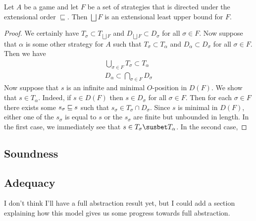 \documentclass{article}
\newcommand{\exle}{\sqsubseteq}
\newcommand{\exlub}{\bigsqcup}
\begin{document}
\begin{proposition}
  Let $A$ be a game and let $F$ be a set of strategies that is directed under the extensional order $\exle$.  Then $\exlub F$ is an extensional least upper bound for $F$.
  \begin{proof}
    We certainly have $T_\sigma\subset T_{\exlub F}$ and $D_{\exlub F}\subset D_\sigma$ for all $\sigma\in F$.  Now suppose that $\alpha$ is some other strategy for $A$ such that $T_\sigma\subset T_\alpha$ and $D_\alpha\subset D_\sigma$ for all $\sigma\in F$.  Then we have
    \begin{gather*}
      \bigcup_{\sigma\in F}T_\sigma\subset T_\alpha \\
      D_\alpha\subset \bigcap_{\sigma\in F} D_\sigma
    \end{gather*}
    Now suppose that $s$ is an infinite and minimal $O$-position in $D(F)$.  We show that $s\in T_\alpha$.  Indeed, if $s\in D(F)$ then $s\in D_\sigma$ for all $\sigma\in F$.  Then for each $\sigma\in F$ there exists some $s_\sigma\sqsubseteq s$ such that $s_\sigma\in T_\sigma\cap D_\sigma$.  Since $s$ is minimal in $D(F)$, either one of the $s_\sigma$ is equal to $s$ or the $s_\sigma$ are finite but unbounded in length.  In the first case, we immediately see that $s\in T_\sigma\susbet T_\alpha$.  In the second case, 
  \end{proof}
\end{proposition}

\subsection{Soundness}

\subsection{Adequacy}

I don't think I'll have a full abstraction result yet, but I could add a section explaining how this model gives us some progress towards full abstraction.  



\end{document}
